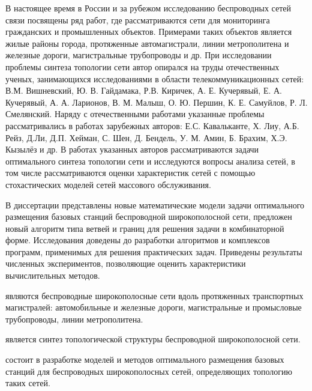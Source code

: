 {\progress} В настоящее время в России и за рубежом исследованию беспроводных сетей связи посвящены ряд работ, где рассматриваются сети для мониторинга гражданских  и промышленных объектов. Примерами таких объектов является жилые районы города, протяженные автомагистрали, линии метрополитена и железные дороги, магистральные трубопроводы и др. При исследовании проблемы синтеза топологии сети автор опирался на труды отечественных ученых, занимающихся исследованиями в области телекоммуникационных сетей: В.М. Вишневский, Ю. В. Гайдамака, Р.В. Киричек, А. Е. Кучерявый, Е. А. Кучерявый, А. А. Ларионов, В. М. Малыш,  О. Ю. Першин, К. Е. Самуйлов, Р. Л. Смелянский. Наряду с отечественными работами указанные проблемы рассматривались в работах зарубежных авторов: Е.С. Кавальканте, Х. Лиу, А.Б. Рейз, Д.Ли, Д.П. Хейман, С. Шен, Д. Бендель, У. М. Амин, Б. Брахим, Х.Э. Кызылёз и др. В работах указанных авторов рассматриваются задачи оптимального синтеза топологии сети и исследуются вопросы анализа сетей, в том числе рассматриваются оценки характеристик сетей с помощью стохастических моделей сетей массового обслуживания. 

В диссертации представлены новые математические модели задачи оптимального размещения базовых станций беспроводной широкополосной сети, предложен новый алгоритм типа ветвей и границ для решения задачи в комбинаторной форме.
Исследования доведены до разработки алгоритмов и комплексов программ, применимых для решения практических задач. Приведены результаты численных экспериментов, позволяющие оценить характеристики вычислительных методов.


{\objectresearch} являются беспроводные широкополосные сети вдоль протяженных транспортных магистралей: автомобильные и железные дороги, магистральные и промысловые трубопроводы, линии метрополитена. 


{\subjectresearch} является синтез топологической структуры беспроводной широкополосной сети.

{\aim} состоит в разработке моделей и методов оптимального размещения базовых станций для беспроводных широкополосных сетей, определяющих топологию таких сетей.

